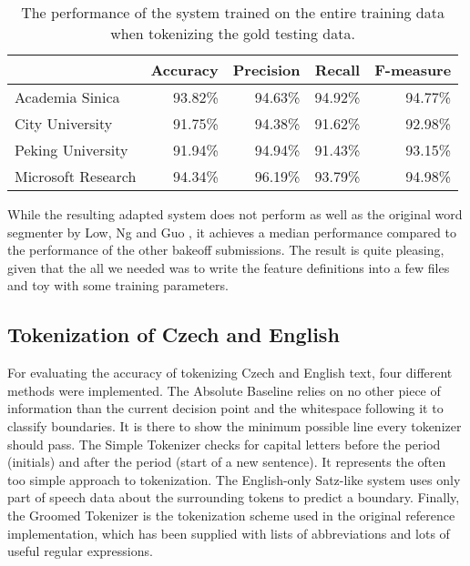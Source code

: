 \begin{table}
  \begin{center}
    \begin{tabular}{ | l | r | r | r | r | }
      \hline
      & Accuracy & Precision & Recall & F-measure \\ \hline
      Academia Sinica & 93.82\% & 94.63\% & 94.92\% & 94.77\% \\ \hline
      City University & 91.75\% & 94.38\% & 91.62\% & 92.98\% \\ \hline
      Peking University & 91.94\% & 94.94\% & 91.43\% & 93.15\% \\ \hline
      Microsoft Research & 94.34\% & 96.19\% & 93.79\% & 94.98\% \\
      \hline
    \end{tabular}
  \end{center}
  \caption[Final performance of Chinese segmenter]
    {The performance of the system trained on the entire training data when
     tokenizing the gold testing data.}
  \label{tbl:bakeoff-final}
\end{table}

While the resulting adapted system does not perform as well as the original
word segmenter by Low, Ng and Guo \cite{seg-chinese-maxent}, it achieves a
median performance compared to the performance of the other bakeoff
submissions. The result is quite pleasing, given that the all we needed was to
write the feature definitions into a few files and toy with some training
parameters.

\subsection{Tokenization of Czech and English}
\label{ssec:eval-acc-eng}

For evaluating the accuracy of tokenizing Czech and English text, four
different methods were implemented. The Absolute Baseline relies on no other
piece of information than the current decision point and the whitespace
following it to classify boundaries. It is there to show the minimum possible
line every tokenizer should pass. The Simple Tokenizer checks for capital
letters before the period (initials) and after the period (start of a new
sentence). It represents the often too simple approach to tokenization. The
English-only Satz-like \cite{sbd-satz} system uses only part of speech data
about the surrounding tokens to predict a boundary. Finally, the Groomed
Tokenizer is the tokenization scheme used in the original reference
implementation, which has been supplied with lists of abbreviations and lots of
useful regular expressions.

